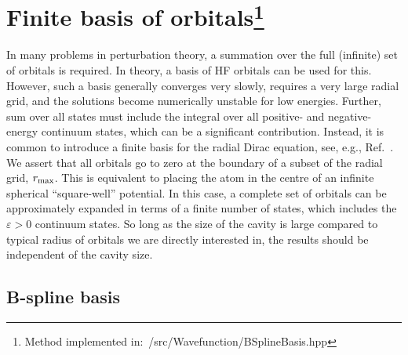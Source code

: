 \documentclass[10pt,twocolumn,a4paper]{article}%
\def\en{\ensuremath{\varepsilon}}
\begin{document}
\section[Finite basis of orbitals]{Finite basis of orbitals\label{sec:finite-basis}\footnote{Method implemented in:~/src/Wavefunction/BSplineBasis.hpp}}

In many problems in perturbation theory, a summation over the full (infinite) set of orbitals is required.
In theory, a basis of HF orbitals can be used for this.
However, such a basis generally converges very slowly, requires a very large radial grid, and the solutions become numerically unstable for low energies.
Further, sum over all states must include the integral over all positive- and negative-energy continuum states, which can be a significant contribution.
%
Instead, it is common to introduce a finite basis for the radial Dirac equation, see, e.g., Ref.~\cite{Johnson1988}.
%
We assert that all orbitals go to zero at the boundary of a subset of the radial grid, $r_{\rm max}$.
This is equivalent to placing the atom in the centre of an infinite spherical ``square-well'' potential.
In this case, a complete set of orbitals can be approximately expanded in terms of a finite number of states, which includes the $\en>0$ continuum states.
So long as the size of the cavity is large compared to typical radius of orbitals we are directly interested in, the results should be independent of the cavity size.




\subsection{B-spline basis}\label{sec:Bsplines}
\end{document}
